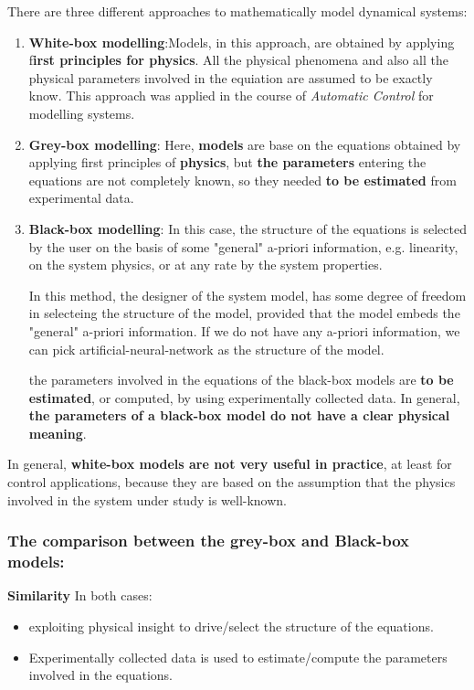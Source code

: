 There are three different approaches to mathematically model dynamical systems:
\begin{enumerate}

\item \textbf{White-box modelling}:\newline Models, in this approach, are obtained by applying f\textbf{irst principles for physics}. All the physical phenomena and also all the physical parameters involved in the equiation are assumed to be exactly know. This approach was applied in the course of \textit{Automatic Control} for modelling systems.

\item \textbf{Grey-box modelling}: Here, \textbf{models} are base on the equations obtained by applying first principles of \textbf{physics}, but \textbf{the parameters} entering the equations are not completely known, so they needed \textbf{to be estimated} from experimental data. 

\item \textbf{Black-box modelling}: In this case, the structure of the equations is selected by the user on the basis of some "general" a-priori information, e.g. linearity, on the system physics, or at any rate by the system properties. \newline \begin{factbox}
    In this method, the designer of the system model, has some degree of freedom in selecteing the structure of the model, provided that the model embeds the "general" a-priori information.\newline \newline
    If we do not have any a-priori information, we can pick artificial-neural-network as the structure of the model.
\end{factbox}
the parameters involved in the equations of the black-box models are \textbf{to be estimated}, or computed, by using experimentally collected data. In general, \textbf{the parameters of a black-box model do not have a clear physical meaning}.
\end{enumerate}


In general, \textbf{white-box models are not very useful in practice}, at least for control applications, because they are based on the assumption that the physics involved in the system under study is well-known.

\subsubsection{The comparison between the grey-box and Black-box models:}
\textbf{Similarity} 
In both cases:
\begin{itemize}
\item  exploiting physical insight to drive/select the structure of the equations.
\item Experimentally collected data is used to estimate/compute the parameters involved in the equations.
\end{itemize}

